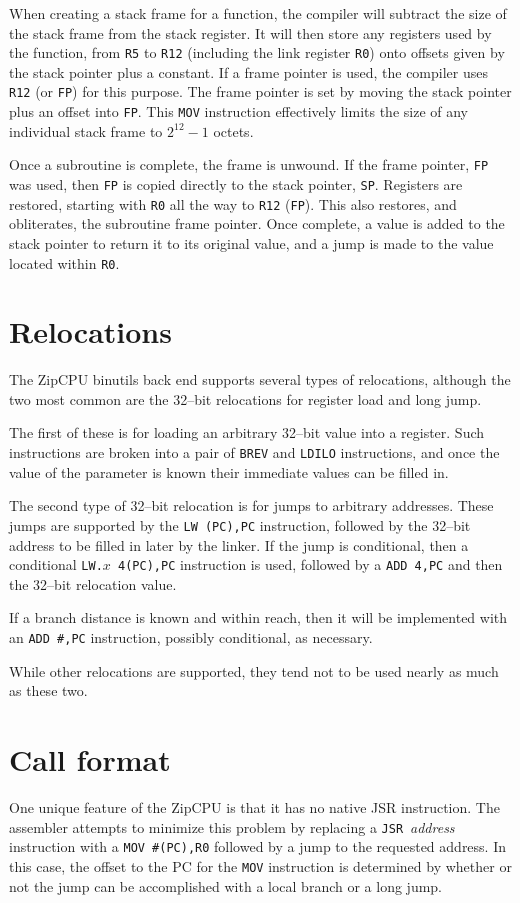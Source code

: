 \documentclass{gqtekspec}
\begin{document}
When creating a stack frame for a function, the compiler will subtract
the size of the stack frame from the stack register.  It will then store
any registers used by the function, from {\tt R5} to {\tt R12} (including
the link register {\tt R0}) onto offsets given by the stack pointer plus a 
constant.  If a frame pointer is used, the compiler uses {\tt R12} (or
{\tt FP}) for this purpose.  The frame pointer is set by moving the stack
pointer plus an offset into {\tt FP}.  This {\tt MOV} instruction effectively
limits the size of any individual stack frame to $2^{12}-1$ octets.

Once a subroutine is complete, the frame is unwound.  If the frame pointer,
{\tt FP} was used, then {\tt FP} is copied directly to the stack pointer,
{\tt SP}.  Registers are restored, starting with {\tt R0} all the way to
{\tt R12} ({\tt FP}).  This also restores, and obliterates, the subroutine
frame pointer.  Once complete, a value is added to the stack pointer to
return it to its original value, and a jump is made to the value located
within {\tt R0}.
\section{Relocations}\label{sec:abi-reloc}
The ZipCPU binutils back end supports several types of relocations, although
the two most common are the 32--bit relocations for register load and long
jump.

The first of these is for loading an arbitrary 32--bit value into a register. 
Such instructions are broken into a pair of {\tt BREV} and {\tt LDILO}
instructions, and once the value of the parameter is known their immediate
values can be filled in.

The second type of 32--bit relocation is for jumps to arbitrary addresses.
These jumps are supported by the \hbox{\tt LW (PC),PC} instruction, followed
by the 32--bit address to be filled in later by the linker.  If the jump is
conditional, then a conditional \hbox{\tt LW.$x$ 4(PC),PC} instruction is
used, followed by a {\tt ADD 4,PC} and then the 32--bit relocation value.

If a branch distance is known and within reach, then it will be implemented
with an {\tt ADD \#,PC} instruction, possibly conditional, as necessary.

While other relocations are supported, they tend not to be used nearly as much
as these two.
\section{Call format}\label{sec:abi-jsr}
One unique feature of the ZipCPU is that it has no native JSR instruction.
The assembler attempts to minimize this problem by replacing a
{\tt JSR}~{\em address} instruction with a {\tt MOV \#(PC),R0} followed by
a jump to the requested address.  In this case, the offset to the PC for the
{\tt MOV} instruction is determined by whether or not the jump can be
accomplished with a local branch or a long jump.
\end{document}
